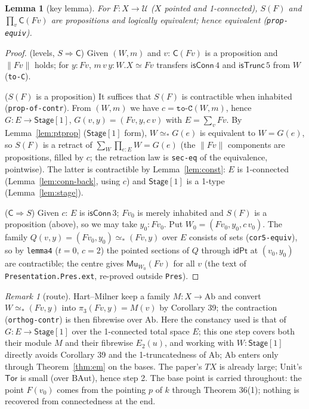 \documentclass[11pt]{amsart}
\newtheorem{lemma}[theorem]{Lemma}
\theoremstyle{definition}
\theoremstyle{remark}
\newtheorem{remark}[theorem]{Remark}
\newcommand{\code}[1]{\texttt{#1}}
\newcommand{\cT}{\mathsf{isTrunc}}
\newcommand{\cC}{\mathsf{isConn}}
\newcommand{\tr}[1]{\|#1\|}
\newcommand{\Ab}{\mathrm{Ab}}
\newcommand{\St}{\mathsf{Stage}}
\newcommand{\Tor}{\mathsf{Tor}}
\newcommand{\Mu}{\mathsf{Mu}}
\newcommand{\pteq}{\simeq_*}
\newcommand{\U}{\mathcal{U}}
\begin{document}
\begin{lemma}[key lemma]\label{lem:key}
For $F:X\to\U$ ($X$ pointed and 1-connected), $S(F)$ and $\prod_v\mathsf{C}(Fv)$ are propositions
and logically equivalent; hence equivalent (\code{prop-equiv}).
\end{lemma}
\begin{proof}
(levels, $S\Rightarrow\mathsf C$) Given $(W,m)$ and $v$: $\mathsf{C}(Fv)$ is a proposition and $\tr{Fv}$ holds; for
$y:Fv$, $m\,v\,y:W.X\simeq Fv$ transfers $\cC\,4$ and $\cT\,5$ from $W$ (\code{to-C}).

($S(F)$ is a proposition) It suffices that $S(F)$ is contractible when inhabited
(\code{prop-of-contr}). From $(W,m)$ we have $c=\code{to-C}(W,m)$, hence
$G:E\to\St[1]$, $G(v,y)=(Fv,y,c\,v)$ with $E=\sum_vFv$. By Lemma~\ref{lem:ptprop}
($\St[1]$ form), $W\pteq G(e)$ is equivalent to $W=G(e)$, so $S(F)$ is a retract of
$\sum_{W}\prod_{e:E}W=G(e)$ (the $\tr{Fv}$ components are propositions, filled by $c$; the
retraction law is \code{sec-eq} of the equivalence, pointwise). The latter is contractible by
Lemma~\ref{lem:const}: $E$ is 1-connected (Lemma~\ref{lem:conn-back}, using $c$) and $\St[1]$
is a 1-type (Lemma~\ref{lem:stage}).

($\mathsf C\Rightarrow S$) Given $c$: $E$ is $\cC\,3$; $Fv_0$ is merely inhabited and $S(F)$ is a
proposition (above), so we may take $y_0:Fv_0$. Put $W_0=(Fv_0,y_0,c\,v_0)$. The family
$Q(v,y)=(Fv_0,y_0)\pteq(Fv,y)$ over $E$ consists of sets (\code{cor5-equiv}), so by
\code{lemma4} ($t=0$, $c=2$) the pointed sections of $Q$ through $\mathsf{idPt}$ at $(v_0,y_0)$
are contractible; the centre gives $\Mu_{W_0}(Fv)$ for all $v$ (the text of
\code{Presentation.Pres.ext}, re-proved outside \code{Pres}).
\end{proof}

\begin{remark}[route]\label{rem:route}
Hart--Milner keep a family $M:X\to\Ab$ and convert $W\pteq(Fv,y)$ into $\pi_3(Fv,y)=M(v)$ by
Corollary 39; the contraction (\code{orthog-contr}) is then fibrewise over $\Ab$. Here the
constancy used is that of $G:E\to\St[1]$ over the 1-connected total space $E$; this one step
covers both their module $M$ and their fibrewise $E_2(u)$, and working with $W:\St[1]$ directly
avoids Corollary 39 and the 1-truncatedness of $\Ab$; $\Ab$ enters only through
Theorem~\ref{thm:em} on the bases. The paper's $T X$ is already large; Unit's $\Tor$ is small
(over $\mathrm{BAut}$), hence step 2.
The base point is carried throughout: the point $F(v_0)$ comes from the pointing $p$ of $k$
through Theorem 36(1); nothing is recovered from connectedness at the end.
\end{remark}
\end{document}
